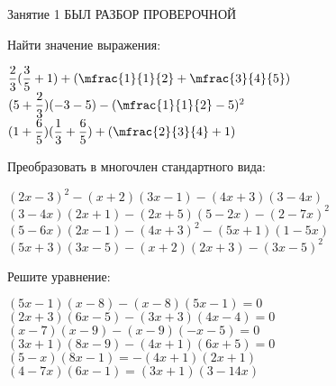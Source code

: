 %
%
\begin{class}[number=1]
	\begin{listofex}
		\item Занятие 1 БЫЛ РАЗБОР ПРОВЕРОЧНОЙ
	\end{listofex}
\end{class}
\begin{class}[number=2]
	\begin{listofex}
		\item Найти значение выражения:
		\begin{itasks}[1]
			\task \( \dfrac{2}{3}(\dfrac{3}{5}+1)+(\mfrac{1}{1}{2}+\mfrac{3}{4}{5}) \)
			\task \( (5+\dfrac{2}{3})(-3-5)-(\mfrac{1}{1}{2}-5)^2 \)
			\task \( (1+\dfrac{6}{5})(\dfrac{1}{3}+\dfrac{6}{5})+(\mfrac{2}{3}{4}+1) \)
		\end{itasks}
		\item Преобразовать в многочлен стандартного вида:
		\begin{itasks}[1]
			\task \( (2x-3)^2-(x+2)(3x-1)-(4x+3)(3-4x) \)
			\task \( (3-4x)(2x+1)-(2x+5)(5-2x)-(2-7x)^2 \)
			\task \( (5-6x)(2x-1)-(4x+3)^2-(5x+1)(1-5x) \)
			\task \( (5x+3)(3x-5)-(x+2)(2x+3)-(3x-5)^2 \)
		\end{itasks}
		\item Решите уравнение:
		\begin{itasks}[1]
			\task \( (5x-1)(x-8)-(x-8)(5x-1)=0 \)
			\task \( (2x+3)(6x-5)-(3x+3)(4x-4)=0 \)
			\task \( (x-7)(x-9)-(x-9)(-x-5)=0 \)
			\task \( (3x+1)(8x-9)-(4x+1)(6x+5)=0 \)
			\task \( (5-x)(8x-1)=-(4x+1)(2x+1) \)
			\task \( (4-7x)(6x-1)=(3x+1)(3-14x) \)
		\end{itasks}
	\end{listofex}
\end{class}

